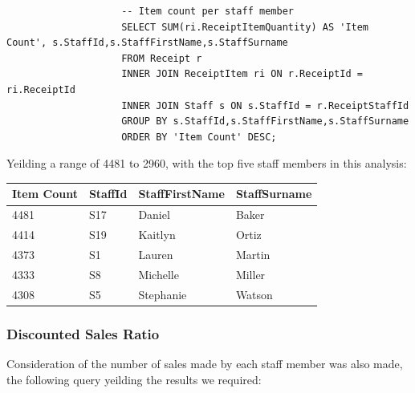 \documentclass{article}
\begin{document}
                \begin{lstlisting}
                    -- Item count per staff member
                    SELECT SUM(ri.ReceiptItemQuantity) AS 'Item Count', s.StaffId,s.StaffFirstName,s.StaffSurname
                    FROM Receipt r
                    INNER JOIN ReceiptItem ri ON r.ReceiptId = ri.ReceiptId
                    INNER JOIN Staff s ON s.StaffId = r.ReceiptStaffId
                    GROUP BY s.StaffId,s.StaffFirstName,s.StaffSurname
                    ORDER BY 'Item Count' DESC;
                \end{lstlisting}

                Yeilding a range of 4481 to 2960, with the top five staff members in this
                analysis:
                \begin{table}[H]
                    \centering
                    \begin{tabular}{|l|l|l|l|}
                    \hline
                    Item Count & StaffId & StaffFirstName & StaffSurname \\ \hline
                    4481       & S17     & Daniel         & Baker        \\ \hline
                    4414       & S19     & Kaitlyn        & Ortiz        \\ \hline
                    4373       & S1      & Lauren         & Martin       \\ \hline
                    4333       & S8      & Michelle       & Miller       \\ \hline
                    4308       & S5      & Stephanie      & Watson       \\ \hline
                    \end{tabular}
                \end{table}
            \subsubsection{Discounted Sales Ratio}
            Consideration of the number of sales made by each staff member was also made,
            the following query yeilding the results we required:
\end{document}

